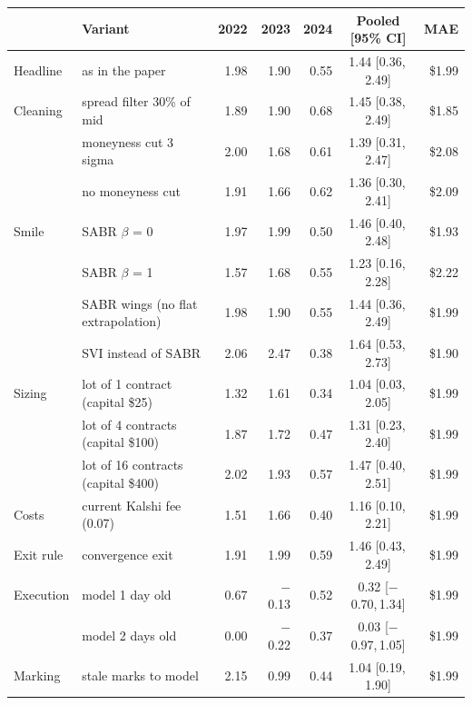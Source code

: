 \begin{tabular}{llrrrcr}
& Variant & 2022 & 2023 & 2024 & Pooled [95\% CI] & MAE \\
\hline
Headline & as in the paper & 1.98 & 1.90 & 0.55 & 1.44 [0.36,\,2.49] & \$1.99 \\
\hline
Cleaning & spread filter 30\% of mid & 1.89 & 1.90 & 0.68 & 1.45 [0.38,\,2.49] & \$1.85 \\
 & moneyness cut 3 sigma & 2.00 & 1.68 & 0.61 & 1.39 [0.31,\,2.47] & \$2.08 \\
 & no moneyness cut & 1.91 & 1.66 & 0.62 & 1.36 [0.30,\,2.41] & \$2.09 \\
\hline
Smile & SABR $\beta$ = 0 & 1.97 & 1.99 & 0.50 & 1.46 [0.40,\,2.48] & \$1.93 \\
 & SABR $\beta$ = 1 & 1.57 & 1.68 & 0.55 & 1.23 [0.16,\,2.28] & \$2.22 \\
 & SABR wings (no flat extrapolation) & 1.98 & 1.90 & 0.55 & 1.44 [0.36,\,2.49] & \$1.99 \\
 & SVI instead of SABR & 2.06 & 2.47 & 0.38 & 1.64 [0.53,\,2.73] & \$1.90 \\
\hline
Sizing & lot of 1 contract (capital \$25) & 1.32 & 1.61 & 0.34 & 1.04 [0.03,\,2.05] & \$1.99 \\
 & lot of 4 contracts (capital \$100) & 1.87 & 1.72 & 0.47 & 1.31 [0.23,\,2.40] & \$1.99 \\
 & lot of 16 contracts (capital \$400) & 2.02 & 1.93 & 0.57 & 1.47 [0.40,\,2.51] & \$1.99 \\
\hline
Costs & current Kalshi fee (0.07) & 1.51 & 1.66 & 0.40 & 1.16 [0.10,\,2.21] & \$1.99 \\
\hline
Exit rule & convergence exit & 1.91 & 1.99 & 0.59 & 1.46 [0.43,\,2.49] & \$1.99 \\
\hline
Execution & model 1 day old & 0.67 & $-$0.13 & 0.52 & 0.32 [$-$0.70,\,1.34] & \$1.99 \\
 & model 2 days old & 0.00 & $-$0.22 & 0.37 & 0.03 [$-$0.97,\,1.05] & \$1.99 \\
\hline
Marking & stale marks to model & 2.15 & 0.99 & 0.44 & 1.04 [0.19,\,1.90] & \$1.99 \\
\end{tabular}
